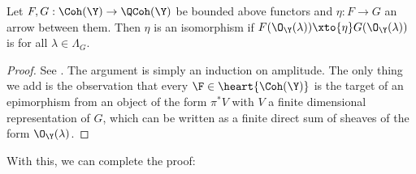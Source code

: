 \documentclass{amsart}
\begin{document}
  \begin{lem}\label{lem:way_out}
    Let \(F,G: \Coh(\Y) \to \QCoh(\Y)\) be bounded above functors and \(\eta: F \to G\)
    an arrow between them. Then \(\eta\) is an isomorphism
    if \(F(\O_\Y(\lambda)) \xto{\eta} G(\O_\Y(\lambda))\) is
    for all \(\lambda \in \Lambda_G\).
  \end{lem}
  \begin{proof}
    See \cite[I.7.1]{hartshorne:1966}. The argument is
    simply an induction on amplitude. The only thing we
    add is the observation that every \(\F \in \heart{\Coh(\Y)}\)
    is the target of an epimorphism from an object of the
    form \(\pi^\ast V\) with \(V\) a finite dimensional
    representation of \(G\), which can be written
    as a finite direct sum of sheaves of the form \(\O_\Y(\lambda)\).
  \end{proof}

  With this, we can complete the proof:
\end{document}
